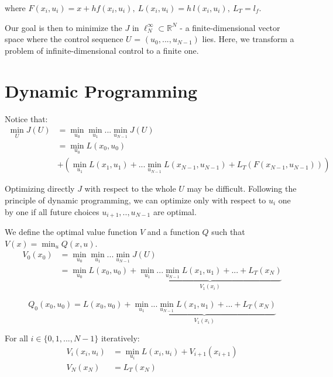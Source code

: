\documentclass{report}
\begin{document}
where $F(x_i, u_i) = x + h f(x_i, u_i), \ L(x_i, u_i) =h\,l(x_i, u_i), \ L_T = l_f $.

\medskip

Our goal is then to minimize the $J$ in $\ell_N^\infty \subset \mathbb{R}^N$ - a finite-dimensional vector space where the control sequence $U$ = $(u_0, ..., u_{N-1})$ lies. Here, we transform a problem of infinite-dimensional control to a finite one.

\section{Dynamic Programming}
Notice that:
\begin{equation}
\begin{split}
\min_{U} J(U) &= \min_{u_0} \min_{u_1} ... \min_{u_{N-1}} J(U) \\
					 &= \min_{u_0} L(x_0, u_0)  \\
					 &+ (\min_{u_1} L(x_1, u_1) +... \min_{u_{N-1}}L(x_{N-1}, u_{N-1}) + L_T(F(x_{N-1}, u_{N-1})))
\end{split}
\end{equation}

Optimizing directly $J$ with respect to the whole $U$ may be difficult. Following the principle of dynamic programming, we can optimize only with respect to $u_i$ one by one if all future choices $u_{i+1}, .., u_{N-1}$ are optimal. 

\medskip
We define the optimal value function $V$ and a function $Q$ such that $V(x) = \min_{u} Q(x, u)$.
\begin{equation}
\begin{split}
V_0(x_0) &= \min_{u_0} \min_{u_1} ... \min_{u_{N-1}} J(U) \\
			&= \min_{u_0} L(x_0, u_0)  + \underbrace{\min_{u_1} ... \min_{u_{N-1}} L(x_1, u_1)+... +L_T(x_N)}_{V_1(x_i)}
\end{split}
\end{equation}


\begin{equation}
Q_0(x_0, u_0) =L(x_0, u_0)  +\underbrace{\min_{u_1} ... \min_{u_{N-1}} L(x_1, u_1)+... +L_T(x_N)}_{V_1(x_i)}
\end{equation}


\medskip

For all  $i\in \{0, 1, ..., N-1\}$ iteratively:
\begin{equation}
\begin{split}
V_i(x_i,u_i) &= \min_{u_i}L(x_i,u_i) + V_{i+1}(x_{i+1}) \\
		V_N(x_N) &= L_T(x_N)
\end{split}
\end{equation}
\end{document}

